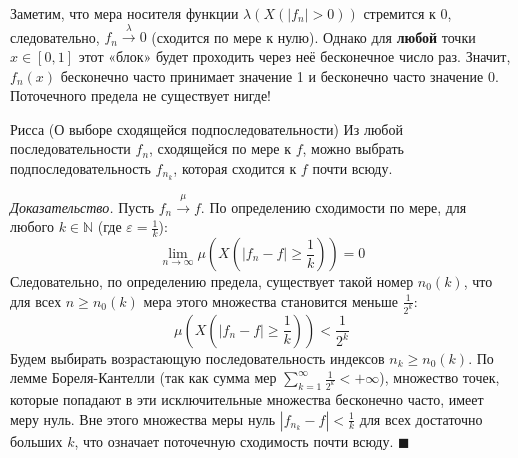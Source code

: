 \documentclass[12pt,a4paper]{article}
\newenvironment{Proof}[1][Доказательство]{\vspace{0.5em}\noindent\textit{#1.}\hspace{0.5em}\ignorespaces}{\hfill$\blacksquare$\vspace{1em}}
\begin{document}
\begin{Example}[ Контрпример ]
\begin{center}
\end{center}

Заметим, что мера носителя функции $\lambda(X(|f_n| > 0))$ стремится к 0, следовательно, $f_n \xrightarrow{\lambda} 0$ (сходится по мере к нулю).
Однако для \textbf{любой} точки $x \in [0, 1]$ этот «блок» будет проходить через неё бесконечное число раз. Значит, $f_n(x)$ бесконечно часто принимает значение 1 и бесконечно часто значение 0. Поточечного предела не существует нигде!
\end{Example}

\begin{Theorem}{Рисса (О выборе сходящейся подпоследовательности)}{}
Из любой последовательности $f_n$, сходящейся по мере к $f$, можно выбрать подпоследовательность $f_{n_k}$, которая сходится к $f$ почти всюду.
\end{Theorem}

\begin{Proof}
Пусть $f_n \xrightarrow{\mu} f$. По определению сходимости по мере, для любого $k \in \mathbb{N}$ (где $\varepsilon = \frac{1}{k}$):
$$ \lim\limits_{n \to \infty} \mu\left( X\left(|f_n - f| \ge \frac{1}{k}\right) \right) = 0 $$
Следовательно, по определению предела, существует такой номер $n_0(k)$, что для всех $n \ge n_0(k)$ мера этого множества становится меньше $\frac{1}{2^k}$:
$$ \mu\left( X\left(|f_n - f| \ge \frac{1}{k}\right) \right) < \frac{1}{2^k} $$
Будем выбирать возрастающую последовательность индексов $n_k \ge n_0(k)$. 
По лемме Бореля-Кантелли (так как сумма мер $\sum\limits_{k=1}^{\infty} \frac{1}{2^k} < +\infty$), множество точек, которые попадают в эти исключительные множества бесконечно часто, имеет меру нуль. Вне этого множества меры нуль $|f_{n_k} - f| < \frac{1}{k}$ для всех достаточно больших $k$, что означает поточечную сходимость почти всюду.
\end{Proof}
\end{document}
